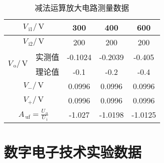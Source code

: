 \documentclass{ctexart}
\renewcommand{\rm}{\,\mathrm}
\begin{document}
	\begin{table}[htbp]
		\centering
		\caption{减法运算放大电路测量数据}
	  	\begin{tabular}{|c|c|c|c|c|}
		\hline
	  	\multicolumn{2}{|c|}{$V_{\rm{i1}}/\rm{V}$} & 300   & 400   & 600 \\
	 	\hline
	 	\multicolumn{2}{|c|}{$V_{\rm{i2}}/\rm{V}$} & 200   & 200   & 200 \\
	 	\hline
	 	\multirow{2}{*}{$V_{\rm{o}}/\rm{V}$} & 实测值   & -0.1024 & -0.2039 & -0.405 \\
  		\cline{2-5}          & 理论值   & -0.1  & -0.2  & -0.4 \\
		\hline
	 	\multicolumn{2}{|c|}{$V_{-}/\rm{V}$} & 0.0996 & 0.0996 & 0.0996 \\
	  	\hline
	  	\multicolumn{2}{|c|}{$V_{+}/\rm{V}$} & 0.0996 & 0.0996 & 0.0996 \\
	  	\hline
	  	\multicolumn{2}{|c|}{$A_{\rm{uf}}=\frac{U_{\rm{o}}}{U_{\rm{i}}}$} & -1.027 & -1.0198 & -1.0125 \\
	  	\hline
	  	\end{tabular}%
  	\end{table}%
  
  






    \newpage
    \section{数字电子技术实验数据}
\end{document}
